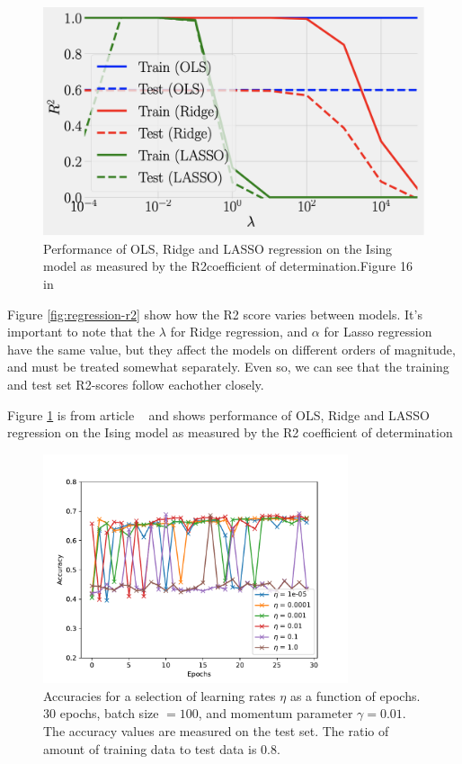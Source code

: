 \begin{figure}[H]
\includegraphics[width = 0.6\paperwidth]{figures/R2_article.png}
\caption{Performance of OLS, Ridge and LASSO regression on the Ising model as measured by the R2coefficient of determination.Figure 16 in ~\cite{HighBias}} 
\label{fig:regression-r2-article}
\end{figure}

Figure \ref{fig:regression-r2} show how the R2 score varies between models. 
It's important to note that the $\lambda$ for Ridge regression, and $\alpha$ 
for Lasso regression have the same value, but they affect the models on 
different orders of magnitude, and must be treated somewhat separately. 
Even so, we can see that the training and test set R2-scores
follow eachother closely.

Figure \ref{fig:regression-r2-article} is from article ~\cite{HighBias} and 
shows performance of OLS, Ridge and LASSO regression
on the Ising model as measured by the R2 coefficient of determination

\begin{figure}[H]
    \centering
\includegraphics[width = 0.8\textwidth]{figures/logistic_eta.pdf}
    \caption{Accuracies for a selection of learning rates $\eta$ as a function of epochs. 
    30 epochs, batch size $= 100$, and momentum parameter $\gamma = 0.01$. The accuracy
    values are measured on the test set.
    The ratio of amount of training data to test data is $0.8$.}
\label{fig:logistic-eta}
\end{figure}

